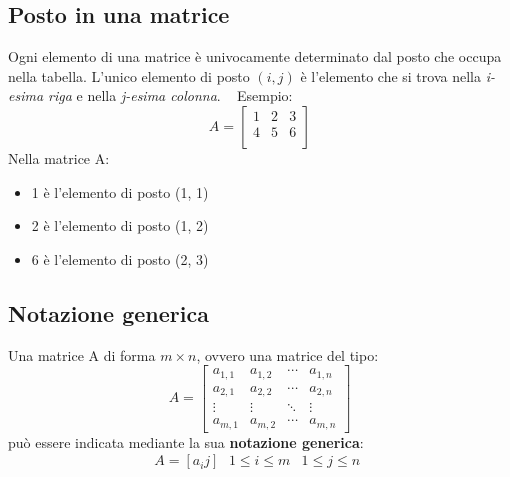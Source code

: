 \documentclass[12pt,oneside]{book}
\begin{document}
\subsection{Posto in una matrice}
Ogni elemento di una matrice è univocamente determinato dal posto che occupa nella tabella.
L'unico elemento di posto $(i,j)$ è l'elemento che si trova nella \emph{i-esima riga} e nella
\emph{j-esima colonna}. \newline
~\newline
Esempio:
\begin{equation*}
    A =
    \begin{bmatrix}
        1 & 2 & 3 \\
        4 & 5 & 6 \\
    \end{bmatrix}
\end{equation*}
Nella matrice A:
\begin{itemize}
    \item 1 è l'elemento di posto (1, 1)
    \item 2 è l'elemento di posto (1, 2)
    \item 6 è l'elemento di posto (2, 3)
\end{itemize}

\subsection{Notazione generica}
Una matrice A di forma $m \times n$, ovvero una matrice del tipo:
\begin{equation*}
    A =
    \begin{bmatrix}
        a_{1,1} & a_{1,2} & \cdots & a_{1,n} \\
        a_{2,1} & a_{2,2} & \cdots & a_{2,n} \\
        \vdots  & \vdots  & \ddots & \vdots  \\
        a_{m,1} & a_{m,2} & \cdots & a_{m,n}
    \end{bmatrix}
\end{equation*}
può essere indicata mediante la sua \textbf{notazione generica}:
\begin{equation*}
    A = [a_ij] \;
    \begin{align}
        1 \le i \le m & 1 \le j \le n
    \end{align}
\end{equation*}
\end{document}
